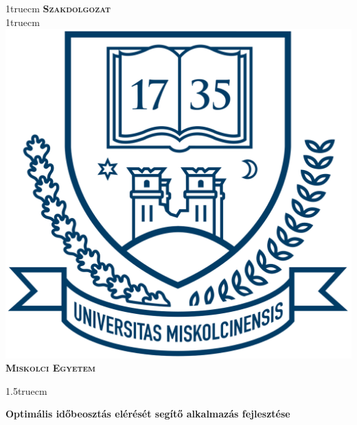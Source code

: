 \pagestyle{empty} %

{\large
\begin{center}
\vglue 1truecm
\textbf{\huge\textsc{Szakdolgozat}}\\
\vglue 1truecm
\includegraphics[width=4.8truecm, height=4truecm]{images/me_logo.png}\\
\textbf{\textsc{Miskolci Egyetem}}
\end{center}}

\vglue 1.5truecm %

{\LARGE
\begin{center}
\textbf{Optimális időbeosztás elérését segítő alkalmazás fejlesztése}
\end{center}}

